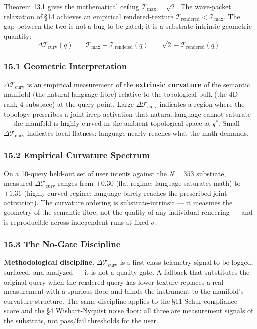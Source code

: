 \documentclass[
  11pt,
]{article}
\begin{document}
Theorem 13.1 gives the mathematical ceiling
\(\mathcal{T}_\text{max} = \sqrt 2\). The wave-packet relaxation of §14
achieves an empirical rendered-texture
\(\mathcal{T}_\text{rendered} < \mathcal{T}_\text{max}\). The gap
between the two is not a bug to be gated; it is a substrate-intrinsic
geometric quantity:
\[\boxed{\quad \Delta\mathcal{T}_\text{curv}(q) \;=\; \mathcal{T}_\text{max} - \mathcal{T}_\text{rendered}(q) \;=\; \sqrt 2 - \mathcal{T}_\text{rendered}(q) \quad} \tag{15.1}\]

\subsubsection{15.1 Geometric
Interpretation}\label{geometric-interpretation}

\(\Delta\mathcal{T}_\text{curv}\) is an empirical measurement of the
\textbf{extrinsic curvature} of the semantic manifold (the
natural-language fibre) relative to the topological bulk (the 4D rank-4
subspace) at the query point. Large \(\Delta\mathcal{T}_\text{curv}\)
indicates a region where the topology prescribes a joint-irrep
activation that natural language cannot saturate --- the manifold is
highly curved in the ambient topological space at \(q^*\). Small
\(\Delta\mathcal{T}_\text{curv}\) indicates local flatness: language
nearly reaches what the math demands.

\subsubsection{15.2 Empirical Curvature
Spectrum}\label{empirical-curvature-spectrum}

On a 10-query held-out set of user intents against the \(N = 353\)
substrate, measured \(\Delta\mathcal{T}_\text{curv}\) ranges from
\(+0.30\) (flat regime: language saturates math) to \(+1.31\) (highly
curved regime: language barely reaches the prescribed joint activation).
The curvature ordering is substrate-intrinsic --- it measures the
geometry of the semantic fibre, not the quality of any individual
rendering --- and is reproducible across independent runs at fixed
\(\sigma\).

\subsubsection{15.3 The No-Gate
Discipline}\label{the-no-gate-discipline}

\textbf{Methodological discipline.} \(\Delta\mathcal{T}_\text{curv}\) is
a first-class telemetry signal to be logged, surfaced, and analyzed ---
it is not a quality gate. A fallback that substitutes the original query
when the rendered query has lower texture replaces a real measurement
with a spurious floor and blinds the instrument to the manifold's
curvature structure. The same discipline applies to the §11 Schur
compliance score and the §4 Wishart-Nyquist noise floor: all three are
measurement signals of the substrate, not pass/fail thresholds for the
user.
\end{document}

